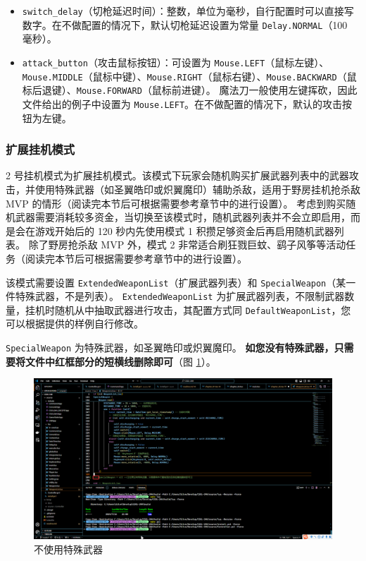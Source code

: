 \begin{itemize}
\item \lstinline{switch_delay}（切枪延迟时间）：整数，单位为毫秒，自行配置时可以直接写数字。在不做配置的情况下，默认切枪延迟设置为常量 \lstinline{Delay.NORMAL}（100 毫秒）。
\item \lstinline{attack_button}（攻击鼠标按钮）：可设置为 \lstinline{Mouse.LEFT}（鼠标左键）、\lstinline{Mouse.MIDDLE}（鼠标中键）、\lstinline{Mouse.RIGHT}（鼠标右键）、\lstinline{Mouse.BACKWARD}（鼠标后退键）、\lstinline{Mouse.FORWARD}（鼠标前进键）。
魔法刀一般使用左键挥砍，因此文件给出的例子中设置为 \lstinline{Mouse.LEFT}。在不做配置的情况下，默认的攻击按钮为左键。
\end{itemize}

\subsubsection{扩展挂机模式}

2 号挂机模式为扩展挂机模式。该模式下玩家会随机购买扩展武器列表中的武器攻击，并使用特殊武器（如圣翼皓印或炽翼魔印）辅助杀敌，适用于野房挂机抢杀敌 MVP 的情形（阅读完本节后可根据需要参考章节中的进行设置）。
考虑到购买随机武器需要消耗较多资金，当切换至该模式时，随机武器列表并不会立即启用，而是会在游戏开始后的 120 秒内先使用模式 1 积攒足够资金后再启用随机武器列表。
除了野房抢杀敌 MVP 外，模式 2 非常适合刷狂戮巨蚊、鹞子风筝等活动任务（阅读完本节后可根据需要参考章节中的进行设置）。

该模式需要设置 \lstinline{ExtendedWeaponList}（扩展武器列表）和 \lstinline{SpecialWeapon}（某一件特殊武器，不是列表）。
\lstinline{ExtendedWeaponList} 为扩展武器列表，不限制武器数量，挂机时随机从中抽取武器进行攻击，其配置方式同 \lstinline{DefaultWeaponList}，您可以根据提供的样例自行修改。

\lstinline{SpecialWeapon} 为特殊武器，如圣翼皓印或炽翼魔印。\textbf{\color{red} 如您没有特殊武器，只需要将文件中红框部分的短横线删除即可}（图 \ref{ch2fig-delete-special-weapon}）。

\begin{figure}
    \Centering
    \includegraphics[width=\textwidth]{docs/assets/delete_SpecialWeapon.png}
    \caption{不使用特殊武器}
    \label{ch2fig-delete-special-weapon}
\end{figure}

